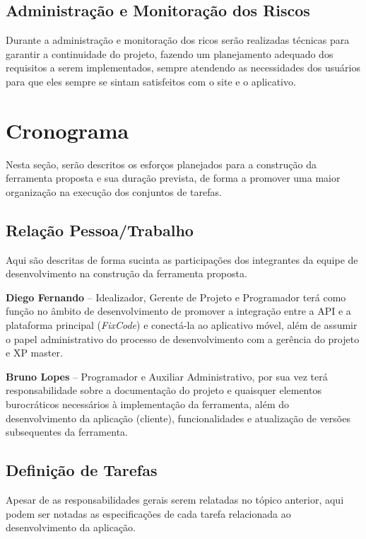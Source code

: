 \documentclass[
	article,			%
	11pt,				%
	oneside,			%
	a4paper,			%
	english,			%
	brazil,				%
	sumario=tradicional
	]{abntex2}
\begin{document}
\subsection{Administração e Monitoração dos Riscos}

Durante a administração e monitoração dos ricos serão realizadas técnicas para garantir a continuidade do projeto, fazendo um planejamento adequado dos requisitos a serem implementados, sempre atendendo as necessidades dos usuários para que eles sempre se sintam satisfeitos com o site e o aplicativo.

\section{Cronograma }

Nesta seção, serão descritos os esforços planejados para a construção da ferramenta proposta e sua duração prevista, de forma a promover uma maior organização na execução dos conjuntos de tarefas. 

\subsection{Relação Pessoa/Trabalho}

Aqui são descritas de forma sucinta as participações dos integrantes da equipe de desenvolvimento na construção da ferramenta proposta. 

\textbf{Diego Fernando} – Idealizador, Gerente de Projeto e Programador terá como função no âmbito de desenvolvimento de promover a integração entre a API e a plataforma principal (\textit{FixCode}) e conectá-la ao aplicativo móvel, além de assumir o papel administrativo do processo de desenvolvimento com a gerência do projeto e XP master.

\textbf{Bruno Lopes} – Programador e Auxiliar Administrativo, por sua vez terá responsabilidade sobre a documentação do projeto e quaisquer elementos burocráticos necessários à implementação da ferramenta, além do desenvolvimento da aplicação (cliente), funcionalidades e atualização de versões subsequentes da ferramenta.

\subsection{Definição de Tarefas}

Apesar de as responsabilidades gerais serem relatadas no tópico anterior, aqui podem ser notadas as especificações de cada tarefa relacionada ao desenvolvimento da aplicação.
\end{document}
